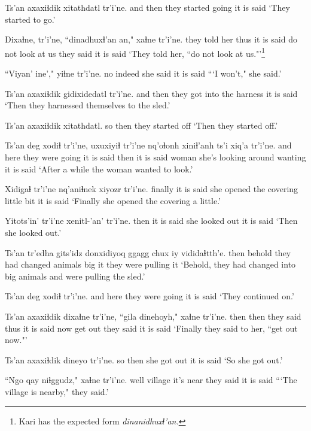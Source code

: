 \documentclass[12pt]{article}
\begin{document}
\gll Ts'an axaxiɬdik xitathdatl  tr'i'ne.
and then {they started going} {it is said}
\glt `They started to go.'
\glend

\gll Dixaɬne, tr'i'ne, {``dinadhuxɬ'an an,"} xaɬne  tr'i'ne.
{they told her thus} {it is said} {do not look at us} {they said} {it is said}
\glt `They told her, ``do not look at us."'\footnote{Kari has the expected form \em dinanidhuxɬ'an.}
\glend

\gll ``Viyan' ine',"  yiɬne  tr'i'ne.
no  indeed {she said} {it is said}
\glt ```I won't," she said.'
\glend

\gll Ts'an axaxiɬdik gidixidedatl   tr'i'ne.
and then {they got into the harness} {it is said}
\glt `Then they harnessed themselves to the sled.'
\glend

\gll Ts'an axaxiɬdik xitathdatl.
so then  {they started off}
\glt `Then they started off.'
\glend

\gll Ts'an deg xodiɬ tr'i'ne, uxuxiyiɬ tr'i'ne nq'oɬonh xiniɬ'anh ts'i xiq'a tr'i'ne.
and here {they were going} {it is said} then  {it is said} woman {she's looking around} {} wanting  {it is said}
\glt `After a while the woman wanted to look.'
\glend

\gll Xidigaɬ tr'i'ne nq'aniɬnek  xiyozr tr'i'ne.
finally  {it is said} {she opened the covering} {little bit} {it is said}
\glt `Finally she opened the covering a little.'
\glend

\gll Yitots'in' tr'i'ne xenitl-'an' tr'i'ne.
then  {it is said} {she looked out} {it is said}
\glt `Then she looked out.'
\glend

\gll Ts'an tr'edha {gits'idz donxidiyoq} ggagg  chux iy vididaɬtth'e.
then behold {they had changed} animals big it {they were pulling it}
\glt `Behold, they had changed into big animals and were pulling the sled.'
\glend

\gll Ts'an deg xodiɬ   tr'i'ne.
and here {they were going} {it is said}
\glt `They continued on.'
\glend

\gll Ts'an axaxiɬdik dixaɬne tr'i'ne, ``gila dinehoyh," xaɬne  tr'i'ne.
then then  {they said thus} {it is said} now {get out} {they said} {it is said}
\glt `Finally they said to her, ``get out now."'
\glend

\gll Ts'an axaxiɬdik dineyo tr'i'ne.
so then  {she got out} {it is said}
\glt `So she got out.'
\glend

\gll ``Ngo qay niɬggudz," xaɬne  tr'i'ne.
well village {it's near} {they said} {it is said}
\glt ```The village is nearby," they said.'
\glend
\end{document}
